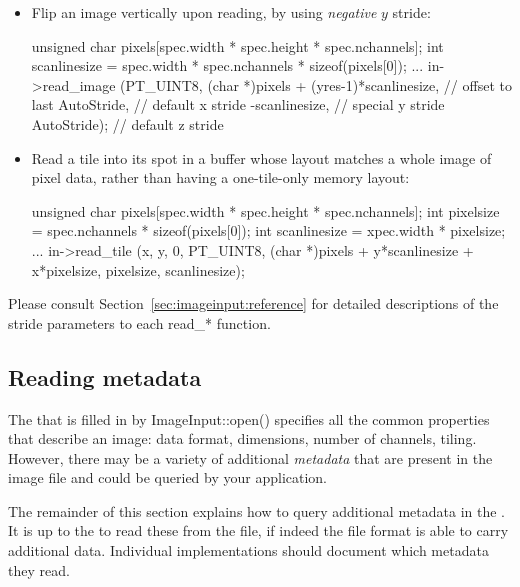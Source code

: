 \begin{itemize}
\item Flip an image vertically upon reading, by using \emph{negative}
  $y$ stride:
  \begin{code}
        unsigned char pixels[spec.width * spec.height * spec.nchannels];
        int scanlinesize = spec.width * spec.nchannels * sizeof(pixels[0]);
        ...
        in->read_image (PT_UINT8,
                        (char *)pixels + (yres-1)*scanlinesize,  // offset to last
                        AutoStride,                      // default x stride
                        -scanlinesize,                   // special y stride
                        AutoStride);                     // default z stride
  \end{code}
\item Read a tile into its spot in a buffer whose layout matches
  a whole image of pixel data,
  rather than having a one-tile-only memory layout:
  \begin{code}
        unsigned char pixels[spec.width * spec.height * spec.nchannels];
        int pixelsize = spec.nchannels * sizeof(pixels[0]);
        int scanlinesize = xpec.width * pixelsize;
        ...
        in->read_tile (x, y, 0, PT_UINT8,
                       (char *)pixels + y*scanlinesize + x*pixelsize,
                       pixelsize,
                       scanlinesize);
  \end{code}
\end{itemize}

Please consult Section~\ref{sec:imageinput:reference} for detailed
descriptions of the stride parameters to each {\cf read_*} function.


\subsection{Reading metadata}
\label{sec:imageinput:metadata}

The \ImageIOFormatSpec that is filled in by {\cf ImageInput::open()}
specifies all the common properties that describe an image: data format,
dimensions, number of channels, tiling.  However, there may be a variety
of additional \emph{metadata} that are present in the image file and
could be queried by your application.

The remainder of this section explains how to query additional metadata
in the \ImageIOFormatSpec.  It is up to the \ImageInput to read these
from the file, if indeed the file format is able to carry additional
data.  Individual \ImageInput implementations should document which
metadata they read.

